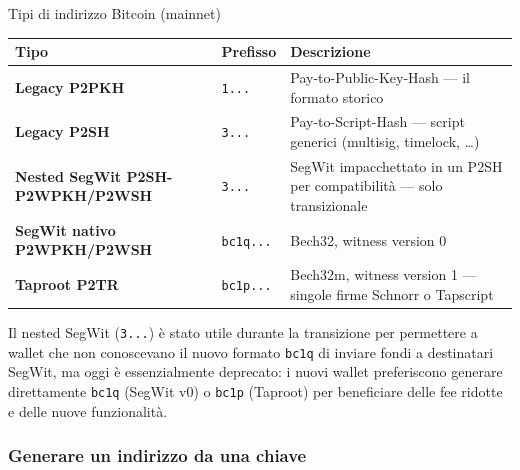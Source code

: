 \documentclass[
  italian,
  openany]{book}
\newcounter{none} %
\begin{document}
\begin{calloutdefinition}{Tipi di indirizzo Bitcoin (mainnet)}

{\def\LTcaptype{none} %
\begin{longtable}[]{@{}
  >{\raggedright\arraybackslash}p{}
  >{\raggedright\arraybackslash}p{}
  >{\raggedright\arraybackslash}p{}@{}}
\toprule\noalign{}
\begin{minipage}[b]{\linewidth}\raggedright
Tipo
\end{minipage} & \begin{minipage}[b]{\linewidth}\raggedright
Prefisso
\end{minipage} & \begin{minipage}[b]{\linewidth}\raggedright
Descrizione
\end{minipage} \\
\midrule\noalign{}
\endhead
\bottomrule\noalign{}
\endlastfoot
\textbf{Legacy P2PKH} & \texttt{1...} & Pay-to-Public-Key-Hash --- il
formato storico \\
\textbf{Legacy P2SH} & \texttt{3...} & Pay-to-Script-Hash --- script
generici (multisig, timelock, \ldots) \\
\textbf{Nested SegWit P2SH-P2WPKH/P2WSH} & \texttt{3...} & SegWit
impacchettato in un P2SH per compatibilità --- solo transizionale \\
\textbf{SegWit nativo P2WPKH/P2WSH} & \texttt{bc1q...} & Bech32, witness
version 0 \\
\textbf{Taproot P2TR} & \texttt{bc1p...} & Bech32m, witness version 1
--- singole firme Schnorr o Tapscript \\
\end{longtable}
}

\end{calloutdefinition}

Il nested SegWit (\texttt{3...}) è stato utile durante la transizione
per permettere a wallet che non conoscevano il nuovo formato
\texttt{bc1q} di inviare fondi a destinatari SegWit, ma oggi è
essenzialmente deprecato: i nuovi wallet preferiscono generare
direttamente \texttt{bc1q} (SegWit v0) o \texttt{bc1p} (Taproot) per
beneficiare delle fee ridotte e delle nuove funzionalità.

\subsubsection{Generare un indirizzo da una
chiave}\label{generare-un-indirizzo-da-una-chiave}
\end{document}
